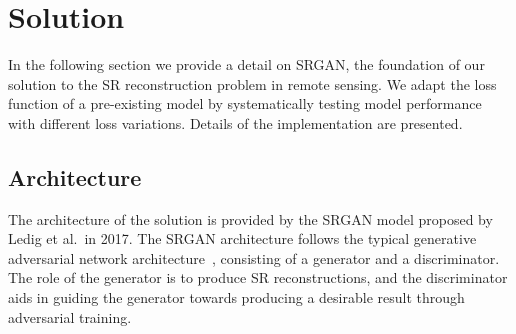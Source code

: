 \section{Solution}
In the following section we provide a detail on SRGAN, the foundation of our solution to the SR reconstruction problem in remote sensing. We adapt the loss function of a pre-existing model by systematically testing model performance with different loss variations. Details of the implementation are presented.

\subsection{Architecture}\label{subsec:architecture}
The architecture of the solution is provided by the SRGAN model proposed by Ledig et al.\ in 2017. The SRGAN architecture follows the typical generative adversarial network architecture~\cite{gan}, consisting of a generator and a discriminator. The role of the generator is to produce SR reconstructions, and the discriminator aids in guiding the generator towards producing a desirable result through adversarial training.

